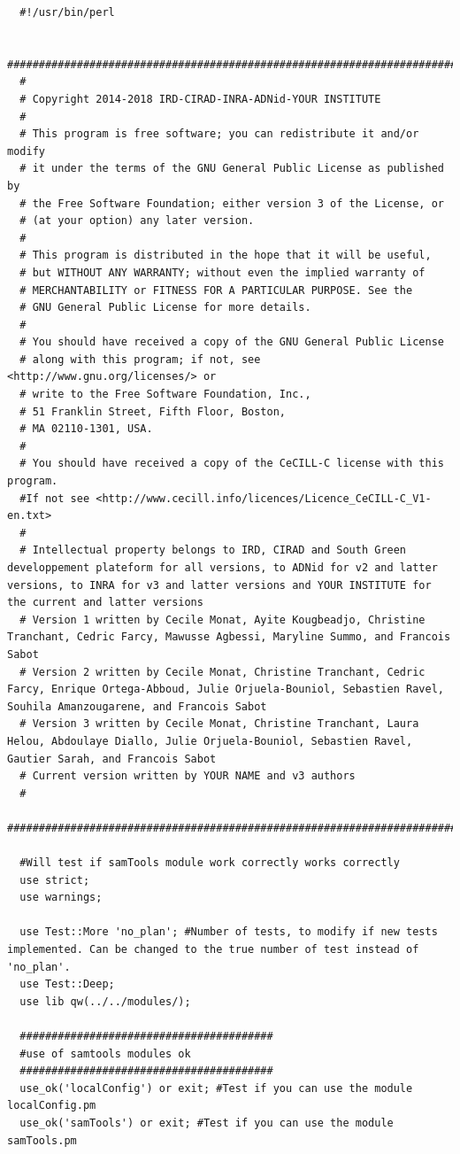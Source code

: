 \documentclass[a4paper,10pt]{report}
\begin{document}
\begin{lstlisting}
  #!/usr/bin/perl

  ################################################################################################################################
  #
  # Copyright 2014-2018 IRD-CIRAD-INRA-ADNid-YOUR INSTITUTE
  #
  # This program is free software; you can redistribute it and/or modify
  # it under the terms of the GNU General Public License as published by
  # the Free Software Foundation; either version 3 of the License, or
  # (at your option) any later version.
  #
  # This program is distributed in the hope that it will be useful,
  # but WITHOUT ANY WARRANTY; without even the implied warranty of
  # MERCHANTABILITY or FITNESS FOR A PARTICULAR PURPOSE. See the
  # GNU General Public License for more details.
  #
  # You should have received a copy of the GNU General Public License
  # along with this program; if not, see <http://www.gnu.org/licenses/> or
  # write to the Free Software Foundation, Inc.,
  # 51 Franklin Street, Fifth Floor, Boston,
  # MA 02110-1301, USA.
  #
  # You should have received a copy of the CeCILL-C license with this program.
  #If not see <http://www.cecill.info/licences/Licence_CeCILL-C_V1-en.txt>
  #
  # Intellectual property belongs to IRD, CIRAD and South Green developpement plateform for all versions, to ADNid for v2 and latter versions, to INRA for v3 and latter versions and YOUR INSTITUTE for the current and latter versions
  # Version 1 written by Cecile Monat, Ayite Kougbeadjo, Christine Tranchant, Cedric Farcy, Mawusse Agbessi, Maryline Summo, and Francois Sabot
  # Version 2 written by Cecile Monat, Christine Tranchant, Cedric Farcy, Enrique Ortega-Abboud, Julie Orjuela-Bouniol, Sebastien Ravel, Souhila Amanzougarene, and Francois Sabot
  # Version 3 written by Cecile Monat, Christine Tranchant, Laura Helou, Abdoulaye Diallo, Julie Orjuela-Bouniol, Sebastien Ravel, Gautier Sarah, and Francois Sabot 
  # Current version written by YOUR NAME and v3 authors
  #
  ################################################################################################################################

  #Will test if samTools module work correctly works correctly
  use strict;
  use warnings;

  use Test::More 'no_plan'; #Number of tests, to modify if new tests implemented. Can be changed to the true number of test instead of 'no_plan'.
  use Test::Deep;
  use lib qw(../../modules/);

  ########################################
  #use of samtools modules ok
  ########################################
  use_ok('localConfig') or exit; #Test if you can use the module localConfig.pm
  use_ok('samTools') or exit; #Test if you can use the module samTools.pm


\end{lstlisting}
\end{document}
